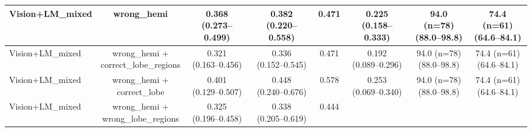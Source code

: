 \documentclass[FCD_GNN.tex]{subfiles}
\begin{document}
\begin{table}[H]
\begin{tabular}{lccccccc}
    \hline
    Vision+LM\_mixed &
    wrong\_hemi &
    \makecell{\colorbox{orange!15}{0.368} \\ (0.273--0.499)} &
    \makecell{\colorbox{orange!15}{0.382} \\ (0.220--0.558)} &
    \colorbox{orange!15}{0.471} &
    \makecell{\colorbox{orange!15}{0.225} \\ (0.158--0.333)} &
    \makecell{94.0 (n=78) \\ (88.0--98.8)} &
    \makecell{\colorbox{green!15}{74.4 (n=61)} \\ (64.6--84.1)} \\
    \hline
    Vision+LM\_mixed &
    \makecell{wrong\_hemi + \\ correct\_lobe\_regions} &
    \makecell{0.321 \\ (0.163--0.456)} &
    \makecell{0.336 \\ (0.152--0.545)} &
    \colorbox{orange!15}{0.471} &
    \makecell{0.192 \\ (0.089--0.296)} &
    \makecell{94.0 (n=78) \\ (88.0--98.8)} &
    \makecell{\colorbox{green!15}{74.4 (n=61)} \\ (64.6--84.1)} \\
    \hline
    Vision+LM\_mixed &
    \makecell{wrong\_hemi + \\ correct\_lobe} &
    \makecell{\colorbox{green!15}{0.401} \\ (0.129--0.507)} &
    \makecell{\colorbox{green!15}{0.448} \\ (0.240--0.676)} &
    \colorbox{green!15}{0.578} &
    \makecell{\colorbox{green!15}{0.253} \\ (0.069--0.340)} &
    \makecell{94.0 (n=78) \\ (88.0--98.8)} &
    \makecell{\colorbox{green!15}{74.4 (n=61)} \\ (64.6--84.1)} \\
    \hline
    Vision+LM\_mixed &
    \makecell{wrong\_hemi + \\ wrong\_lobe\_regions} &
    \makecell{0.325 \\ (0.196--0.458)} &
    \makecell{0.338 \\ (0.205--0.619)} &
    0.444 &

\end{tabular}
\end{table}
\end{document}
